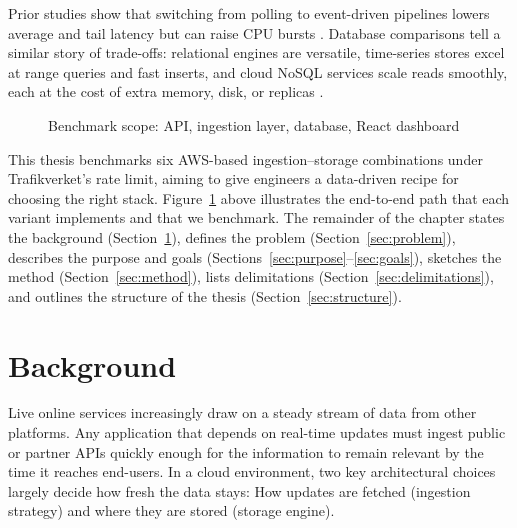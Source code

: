 \documentclass[nomenclature, english, biblatex]{kththesis}
\numberwithin{listing}{chapter}
\begin{document}
\noindent
Prior studies show that switching from polling to event-driven pipelines lowers average and tail latency but can raise CPU bursts \cite{Trindade2021EDAImpact}. 
Database comparisons tell a similar story of trade-offs: relational engines are versatile, time-series stores excel at range queries and fast inserts, and cloud NoSQL services scale reads smoothly, each at the cost of extra memory, disk, or replicas \cite{Heldt2021SciTS,Grzesik2020EdgeIoTBenchmark,Vergara2021PerformanceTSDB}.

\begin{figure}[htbp]
 \centering
 \caption{Benchmark scope: API, ingestion layer, database, React dashboard}
 \label{fig:pipeline}
\end{figure}

\noindent
This thesis benchmarks six AWS-based ingestion–storage combinations under Trafikverket's rate limit, aiming to give engineers a data-driven recipe for choosing the right stack. Figure~\ref{fig:pipeline} above illustrates the end-to-end path that each variant implements and that we benchmark.
The remainder of the chapter states the background (Section~\ref{sec:background}), defines the problem (Section~\ref{sec:problem}), describes the purpose and goals (Sections~\ref{sec:purpose}–\ref{sec:goals}), sketches the method (Section~\ref{sec:method}), lists delimitations (Section~\ref{sec:delimitations}), and outlines the structure of the thesis (Section~\ref{sec:structure}).




\section{Background}
\label{sec:background}
Live online services increasingly draw on a steady stream of data from other platforms. Any application that depends on real-time updates must ingest public or partner \glspl{API} quickly enough for the information to remain relevant by the time it reaches end-users. In a cloud environment, two key architectural choices largely decide how fresh the data stays: How updates are fetched (ingestion strategy) and where they are stored (storage engine).
\end{document}
